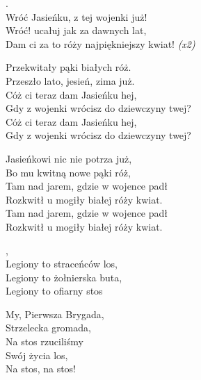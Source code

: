 \documentclass[12pt,a4paper,twoside]{songbook}
\begin{document}
  

  \begin{info}
    \lipsum[1]
  \end{info}
  \setlength{\vgap}{10pt}
  \begin{lyrics}
    .\\
    Wróć Jasieńku, z tej wojenki już!\\
    \vin Wróć! ucałuj jak za dawnych lat,\\
    \vin Dam ci za to róży najpiękniejszy kwiat! \emph{(x2)}
    
    Przekwitały pąki białych róż.\\
    Przeszło lato, jesień, zima już.\\
    Cóż ci teraz dam Jasieńku hej,\\
    Gdy z wojenki wrócisz do dziewczyny twej?\\
    
    Cóż ci teraz dam Jasieńku hej,\\
    Gdy z wojenki wrócisz do dziewczyny twej?
    
    Jasieńkowi nic nie potrza już,\\
    Bo mu kwitną nowe pąki róż,\\
    Tam nad jarem, gdzie w wojence padł\\
    Rozkwitł u mogiły białej róży kwiat.\\
    Tam nad jarem, gdzie w wojence padł\\
    Rozkwitł u mogiły białej róży kwiat.\\
  \end{lyrics}


  \begin{info}
    \lipsum[1]
  \end{info}

  \begin{lyrics}[longestline=Legiony to straceńców los]
  , \\
  Legiony to straceńców los, \\
  Legiony to żołnierska buta, \\
  Legiony to ofiarny stos
  
  My, Pierwsza Brygada,\\
  Strzelecka gromada,\\
  Na stos rzuciliśmy\\
  Swój życia los,\\
  Na stos, na stos!
  \end{lyrics}
\end{document}
